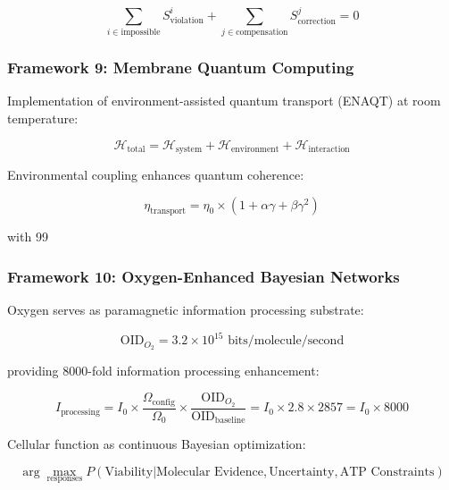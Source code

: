 \documentclass[11pt,a4paper]{article}
\begin{document}
\begin{equation}
\sum_{i \in \text{impossible}} S_{\text{violation}}^i + \sum_{j \in \text{compensation}} S_{\text{correction}}^j = 0
\end{equation}

\subsubsection{Framework 9: Membrane Quantum Computing}

Implementation of environment-assisted quantum transport (ENAQT) at room temperature:

\begin{equation}
\mathcal{H}_{\text{total}} = \mathcal{H}_{\text{system}} + \mathcal{H}_{\text{environment}} + \mathcal{H}_{\text{interaction}}
\end{equation}

Environmental coupling enhances quantum coherence:

\begin{equation}
\eta_{\text{transport}} = \eta_0 \times (1 + \alpha \gamma + \beta \gamma^2)
\end{equation}

with 99%

\subsubsection{Framework 10: Oxygen-Enhanced Bayesian Networks}

Oxygen serves as paramagnetic information processing substrate:

\begin{equation}
\text{OID}_{O_2} = 3.2 \times 10^{15} \text{ bits/molecule/second}
\end{equation}

providing 8000-fold information processing enhancement:

\begin{equation}
I_{\text{processing}} = I_0 \times \frac{\Omega_{\text{config}}}{\Omega_0} \times \frac{\text{OID}_{O_2}}{\text{OID}_{\text{baseline}}} = I_0 \times 2.8 \times 2857 = I_0 \times 8000
\end{equation}

Cellular function as continuous Bayesian optimization:

\begin{equation}
\arg\max_{\text{responses}} P(\text{Viability} | \text{Molecular Evidence}, \text{Uncertainty}, \text{ATP Constraints})
\end{equation}
\end{document}
